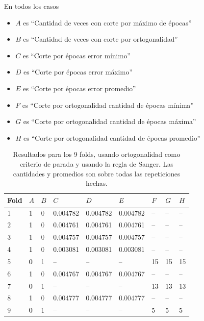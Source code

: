 \documentclass[informe.tex]{subfiles}
\begin{document}
	En todos los casos 
	\begin{itemize}
	\item $A$ es ``Cantidad de veces con corte por máximo de épocas''
	\item $B$ es ``Cantidad de veces con corte por ortogonalidad''
	\item $C$ es ``Corte por épocas error mínimo''
	\item $D$ es ``Corte por épocas error máximo''
	\item $E$ es ``Corte por épocas error promedio''
	\item $F$ es ``Corte por ortogonalidad cantidad de épocas mínima''
	\item $G$ es ``Corte por ortogonalidad cantidad de épocas máxima''
	\item $H$ es ``Corte por ortogonalidad cantidad de épocas promedio''
	\end{itemize}
  
	
	
	\begin{table}[H]
	  \centering
	  \begin{tabular}{|l|l|l|l|l|l|l|l|l|} \hline
	  Fold & $A$ & $B$ & $C$ & $D$ & $E$ & $F$ & $G$ & $H$ \\ \hline
	  1& 1 & 0 & 0.004782 & 0.004782 & 0.004782 & -- & -- & -- \\ \hline
	  2& 1 & 0 & 0.004761 & 0.004761 & 0.004761 & -- & -- & -- \\ \hline
	  3& 1 & 0 & 0.004757 & 0.004757 & 0.004757 & -- & -- & -- \\ \hline
	  4& 1 & 0 & 0.003081 & 0.003081 & 0.003081 & -- & -- & -- \\ \hline
	  5& 0 & 1 & -- & -- & -- & 15 & 15 & 15 \\ \hline
	  6& 1 & 0 & 0.004767 & 0.004767 & 0.004767 & -- & -- & -- \\ \hline
	  7& 0 & 1 & -- & -- & -- & 13 & 13 & 13 \\ \hline
	  8& 1 & 0 & 0.004777 & 0.004777 & 0.004777 & -- & -- & -- \\ \hline
	  9& 0 & 1 & -- & -- & -- & 5 & 5 & 5 \\ \hline
	  \end{tabular}
	  \caption{Resultados para los 9 folds, usando ortogonalidad como criterio de parada y usando la regla de Sanger. Las cantidades y promedios son sobre todas las repeticiones hechas.}
	  \label{tab:ortogonalidad_sanger}
	\end{table}
\end{document}
